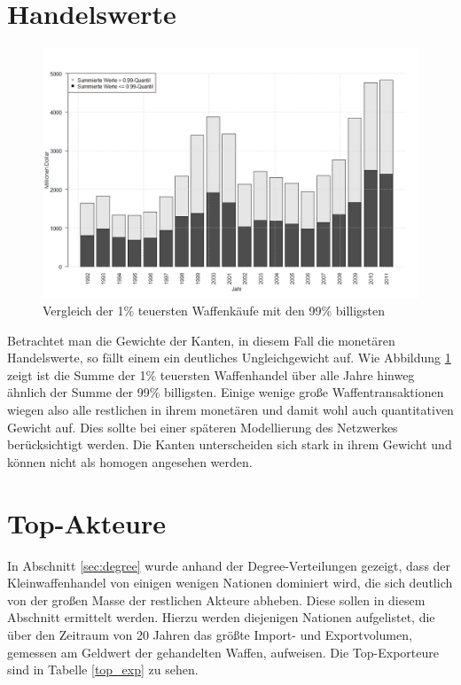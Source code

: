 \documentclass[a4paper,ngerman,oneside,titlepage,bibliography=totoc,11pt]{scrreprt}
\begin{document}
\section{Handelswerte}

\begin{figure}[ht]
	\centering
		\includegraphics[width=1.00\textwidth]{Grafiken/ts_value.png}
	\caption{Vergleich der 1\% teuersten Waffenkäufe mit den 99\% billigsten}
	\label{fig:ts_value}
\end{figure}

Betrachtet man die Gewichte der Kanten, in diesem Fall die monetären Handelswerte, so fällt einem ein deutliches Ungleichgewicht auf. Wie Abbildung \ref{fig:ts_value} zeigt ist die Summe der 1\% teuersten Waffenhandel über alle Jahre hinweg ähnlich der Summe der 99\% billigsten. Einige wenige große Waffentransaktionen wiegen also alle restlichen in ihrem monetären und damit wohl auch quantitativen Gewicht auf. Dies sollte bei einer späteren Modellierung des Netzwerkes berücksichtigt werden. Die Kanten unterscheiden sich stark in ihrem Gewicht und können nicht als homogen angesehen werden.

\section{Top-Akteure}
\label{sec:top-akteure}
In Abschnitt \ref{sec:degree} wurde anhand der Degree-Verteilungen gezeigt, dass der Kleinwaffenhandel von einigen wenigen Nationen dominiert wird, die sich deutlich von der großen Masse der restlichen Akteure abheben. Diese sollen in diesem Abschnitt ermittelt werden. Hierzu werden diejenigen Nationen aufgelistet, die über den Zeitraum von 20 Jahren das größte Import- und Exportvolumen, gemessen am Geldwert der gehandelten Waffen, aufweisen. Die Top-Exporteure sind in Tabelle \ref{top_exp} zu sehen.
\end{document}
